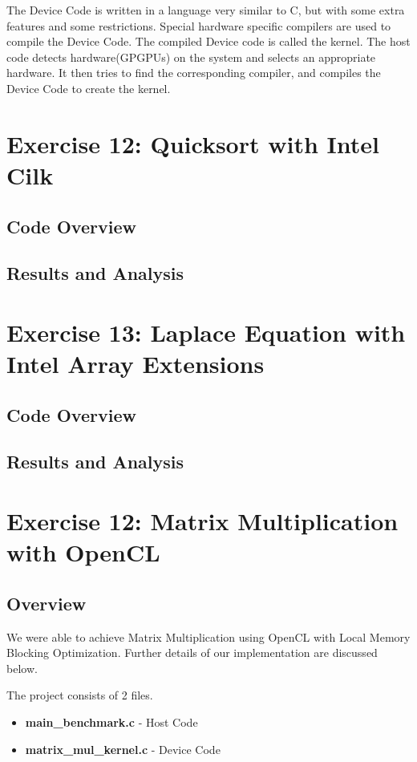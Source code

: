 \documentclass[]{scrartcl}
\begin{document}
The Device Code is written in a language very similar to C, but with some extra features
and some restrictions. Special hardware specific compilers are used to compile the Device Code.
The compiled Device code is called the kernel. The host code detects hardware(GPGPUs) on the 
system and selects an appropriate hardware. It then tries to find the corresponding compiler,
and compiles the Device Code to create the kernel.

\pagebreak
\section{Exercise 12: Quicksort with Intel Cilk}

\subsection{Code Overview}

\subsection{Results and Analysis}

\pagebreak
\section{Exercise 13: Laplace Equation with Intel Array Extensions}

\subsection{Code Overview}

\subsection{Results and Analysis}

\pagebreak
\section{Exercise 12: Matrix Multiplication with OpenCL}

\subsection{Overview}
We were able to achieve Matrix Multiplication using OpenCL with Local Memory Blocking Optimization.
Further details of our implementation are discussed below.

The project consists of 2 files.
\begin{itemize}
	\item \textbf{main\_benchmark.c} - Host Code
	\item \textbf{matrix\_mul\_kernel.c} - Device Code
\end{itemize}
\end{document}
